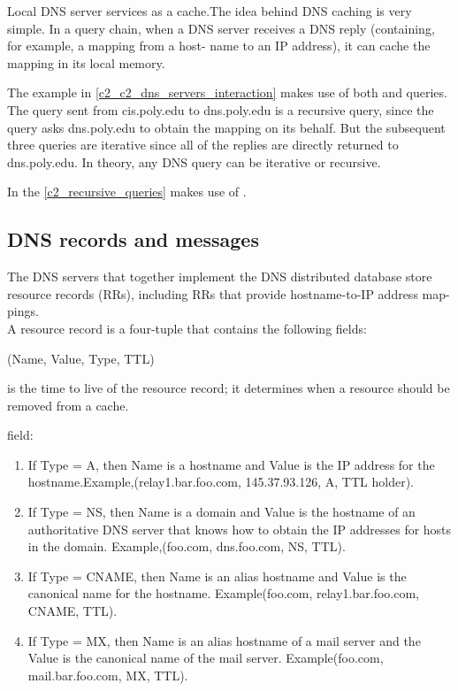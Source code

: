 
Local DNS server services as a cache.The idea behind DNS caching is very simple. In a query chain, when a
DNS server receives a DNS reply (containing, for example, a mapping from a host-
name to an IP address), it can cache the mapping in its local memory.\\
\newline

The example in \autoref{c2_c2_dns_servers_interaction} makes use of both  and 
 queries. The query sent from cis.poly.edu to dns.poly.edu is a
recursive query, since the query asks dns.poly.edu to obtain the mapping on its behalf. But the subsequent three queries are iterative since all of the replies are
directly returned to dns.poly.edu. In theory, any DNS query can be iterative or
recursive.



In the \autoref{c2_recursive_queries} makes use of .

\subsection{DNS records and messages}

The DNS servers that together implement the DNS distributed database store
resource records (RRs), including RRs that provide hostname-to-IP address map-
pings.\\

A resource record is a four-tuple that contains the following fields:
\begin{center}
    (Name, Value, Type, TTL)
\end{center}

 is the time to live of the resource record; it determines when
a resource should be removed from a cache.

 field:
\begin{enumerate}
    \item If Type = A, then Name is a hostname and Value is the IP address for the hostname.Example,(relay1.bar.foo.com, 145.37.93.126, A, TTL holder).
    \item If Type = NS, then Name is a domain and Value is the hostname of an authoritative DNS server that knows how to obtain the IP addresses for hosts in the domain. Example,(foo.com, dns.foo.com, NS, TTL).
    \item If Type = CNAME, then Name is an alias hostname and Value is the canonical name for the hostname. Example(foo.com, relay1.bar.foo.com, CNAME, TTL).
    \item If Type = MX, then Name is an alias hostname of a mail server and the Value is the canonical name of the mail server. Example(foo.com, mail.bar.foo.com, MX, TTL).
\end{enumerate}

